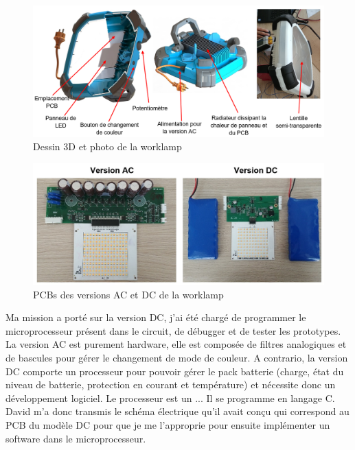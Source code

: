 \documentclass[a4paper, 11pt]{report}
\begin{document}
\begin{figure}[!h]
\begin{center}
\includegraphics[scale=0.5]{figures/screenshots/captioned_worklamp.png}
\end{center}
\caption{Dessin 3D et photo de la worklamp} %
\label{fig:captioned_worklamp}
\end{figure}

\begin{figure}[!h]
\begin{center}
\includegraphics[scale=0.5]{figures/photos/worklamp_PCBs.jpg}
\end{center}
\caption{PCBs des versions AC et DC de la worklamp} %
\label{fig:worklamp_PCBs}
\end{figure}

Ma mission a porté sur la version DC, j’ai été chargé de programmer le microprocesseur présent dans le circuit, de débugger et de tester les prototypes. La version AC est purement hardware, elle est composée  de filtres analogiques et de bascules pour gérer le changement de mode de couleur. A contrario, la version DC comporte un processeur pour pouvoir gérer le pack batterie (charge, état du niveau de batterie, protection en courant et température) et nécessite donc un développement logiciel. Le processeur est un ... 
Il se programme en langage C.
David m’a donc transmis le schéma électrique qu’il avait conçu qui correspond au PCB du modèle DC pour que je me l’approprie pour ensuite implémenter un software dans le microprocesseur.
\end{document}

